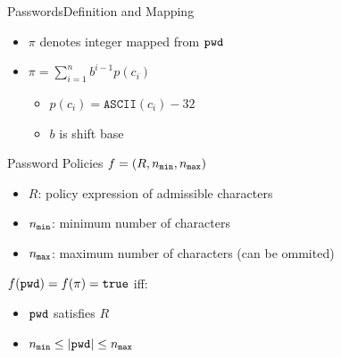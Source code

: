 \documentclass[notes,xcolor=dvipsnames]{beamer}
\begin{document}
\begin{frame}{Passwords}{Definition and Mapping}
\begin{itemize}
  \item $\pi$ denotes integer mapped from $\mathtt{pwd}$
  \item $\pi=\sum_{i=1}^n b^{i-1}p(c_i)$
  \begin{itemize}
    \item $p(c_i)=\texttt{ASCII}(c_i)-32$
    \item $b$ is shift base
  \end{itemize}
\end{itemize}

\end{frame}

\begin{frame}{Password Policies}
   $f=(R, {n_\mathtt{min}}, {n_\mathtt{max}})$
  \begin{itemize}
    \item $R$: policy expression of admissible characters
    \item ${n_\mathtt{min}}$: minimum number of characters
    \item ${n_\mathtt{max}}$: maximum number of characters (can be ommited)
  \end{itemize}
  
  \vspace*{2em}
  $f(\mathtt{pwd})=f(\pi)=\mathtt{true}$ iff:
  \begin{itemize}
    \item $\mathtt{pwd}$ satisfies $R$
    \item ${n_\mathtt{min}}\leq |\mathtt{pwd}| \leq {n_\mathtt{max}}$
  \end{itemize}
\end{frame}
\end{document}
